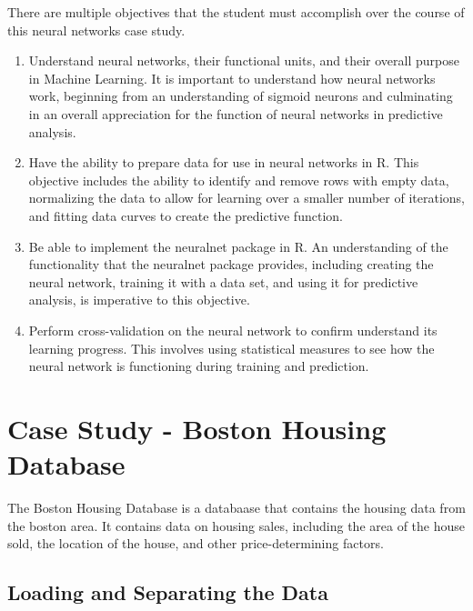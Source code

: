 There are multiple objectives that the student must accomplish over the course of this neural networks case study.
\begin{enumerate}
\item Understand neural networks, their functional units, and their overall purpose in Machine Learning.
It is important to understand how neural networks work, beginning from an understanding of sigmoid neurons and culminating in an overall appreciation for the function of neural networks in predictive analysis.
\item Have the ability to prepare data for use in neural networks in R.
This objective includes the ability to identify and remove rows with empty data, normalizing the data to allow for learning over a smaller number of iterations, and fitting data curves to create the predictive function.
\item Be able to implement the neuralnet package in R.
An understanding of the functionality that the neuralnet package provides, including creating the neural network, training it with a data set, and using it for predictive analysis, is imperative to this objective.
\item Perform cross-validation on the neural network to confirm understand its learning progress.
This involves using statistical measures to see how the neural network is functioning during training and prediction.
\end{enumerate}
\section{Case Study - Boston Housing Database}

The Boston Housing Database is a databaase that contains the housing data from the boston area.
It contains data on housing sales, including the area of the house sold, the location of the house, and other price-determining factors.

\subsection{Loading and Separating the Data}

